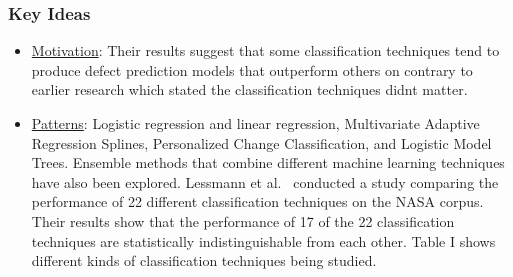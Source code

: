 \documentclass[conference]{IEEEtran}
\begin{document}
\subsubsection{\textbf{Key Ideas}}
\begin{itemize}
    \item \underline{Motivation}: Their results suggest that some classification techniques tend to produce defect prediction models that outperform others on contrary to earlier research which stated the classification techniques didnt matter.
    \item \underline{Patterns}: Logistic regression and linear regression, Multivariate Adaptive Regression Splines, Personalized Change Classification, and Logistic Model Trees. Ensemble methods that combine different machine learning techniques have also been explored. Lessmann et al.~\cite{lessmann2008benchmarking} conducted a study comparing the performance of 22 different classification techniques on the NASA corpus. Their results show that the performance of 17 of the 22 classification techniques are statistically indistinguishable from each other. Table I shows different kinds of classification techniques being studied.
    \begin{figure}[!htbp]
     \centering

\end{figure}
\end{itemize}
\end{document}
